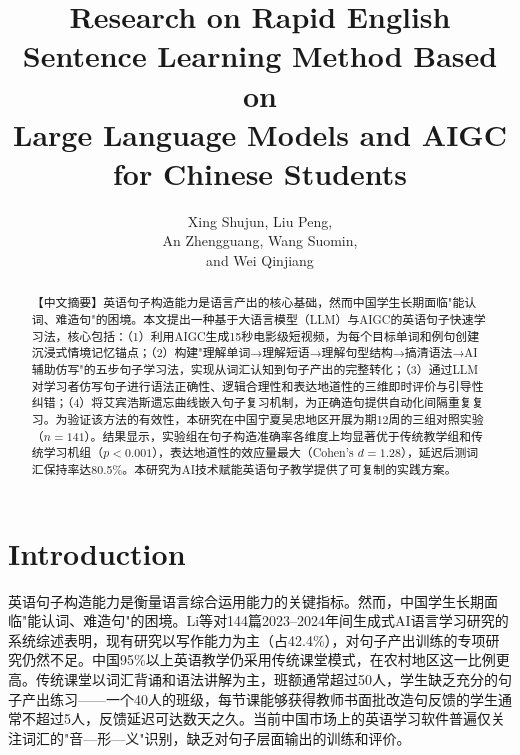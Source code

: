 \documentclass[Afour,sageapa,times]{sagej}
\begin{document}

\title{Research on Rapid English Sentence Learning Method Based on\\ Large Language Models and AIGC for Chinese Students}

\author{Xing Shujun, Liu Peng,\\
An Zhengguang, Wang Suomin,\\
and Wei Qinjiang}




\begin{abstract}
【中文摘要】英语句子构造能力是语言产出的核心基础，然而中国学生长期面临"能认词、难造句"的困境。本文提出一种基于大语言模型（LLM）与AIGC的英语句子快速学习法，核心包括：（1）利用AIGC生成15秒电影级短视频，为每个目标单词和例句创建沉浸式情境记忆锚点；（2）构建"理解单词→理解短语→理解句型结构→搞清语法→AI辅助仿写"的五步句子学习法，实现从词汇认知到句子产出的完整转化；（3）通过LLM对学习者仿写句子进行语法正确性、逻辑合理性和表达地道性的三维即时评价与引导性纠错；（4）将艾宾浩斯遗忘曲线嵌入句子复习机制，为正确造句提供自动化间隔重复复习。为验证该方法的有效性，本研究在中国宁夏吴忠地区开展为期12周的三组对照实验（$n=141$）。结果显示，实验组在句子构造准确率各维度上均显著优于传统教学组和传统学习机组（$p<0.001$），表达地道性的效应量最大（Cohen's $d=1.28$），延迟后测词汇保持率达80.5\%。本研究为AI技术赋能英语句子教学提供了可复制的实践方案。
\end{abstract}


\maketitle


\section{Introduction}  %

英语句子构造能力是衡量语言综合运用能力的关键指标。然而，中国学生长期面临"能认词、难造句"的困境。Li等\cite{li2025twoyears}对144篇2023--2024年间生成式AI语言学习研究的系统综述表明，现有研究以写作能力为主（占42.4\%），对句子产出训练的专项研究仍然不足。中国95\%以上英语教学仍采用传统课堂模式，在农村地区这一比例更高。传统课堂以词汇背诵和语法讲解为主，班额通常超过50人\cite{wang2011large}，学生缺乏充分的句子产出练习——一个40人的班级，每节课能够获得教师书面批改造句反馈的学生通常不超过5人，反馈延迟可达数天之久。当前中国市场上的英语学习软件普遍仅关注词汇的"音—形—义"识别，缺乏对句子层面输出的训练和评价。
\end{document}
